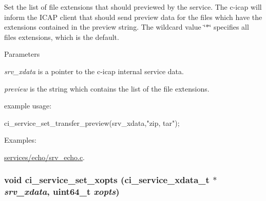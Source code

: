 Set the list of file extensions that should previewed by the service. The c-\/icap will inform the ICAP client that should send preview data for the files which have the extensions contained in the preview string. The wildcard value \char`\"{}$\ast$\char`\"{} specifies all files extensions, which is the default. 
\begin{DoxyParams}{Parameters}
\item[{\em srv\_\-xdata}]is a pointer to the c-\/icap internal service data. \item[{\em preview}]is the string which contains the list of the file extensions.\end{DoxyParams}
example usage: 
\begin{DoxyCode}
   ci_service_set_transfer_preview(srv_xdata,"zip, tar");
\end{DoxyCode}
 \begin{Desc}
\item[Examples: ]\par
\hyperlink{services_2echo_2srv__echo_8c-example}{services/echo/srv\_\-echo.c}.\end{Desc}
\hypertarget{group__SERVICES_ga7da5b123d299b8b91930fe5eb669e254}{
\subsubsection[{ci\_\-service\_\-set\_\-xopts}]{\setlength{\rightskip}{0pt plus 5cm}void ci\_\-service\_\-set\_\-xopts ({\bf ci\_\-service\_\-xdata\_\-t} $\ast$ {\em srv\_\-xdata}, \/  uint64\_\-t {\em xopts})}}
\label{group__SERVICES_ga7da5b123d299b8b91930fe5eb669e254}


